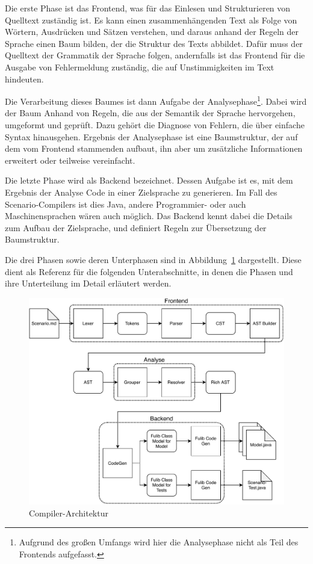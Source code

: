 Die erste Phase ist das Frontend, was für das Einlesen und Strukturieren von Quelltext zuständig ist.
Es kann einen zusammenhängenden Text als Folge von Wörtern, Ausdrücken und Sätzen verstehen,
und daraus anhand der Regeln der Sprache einen Baum bilden,
der die Struktur des Texts abbildet.
Dafür muss der Quelltext der Grammatik der Sprache folgen,
andernfalls ist das Frontend für die Ausgabe von Fehlermeldung zuständig,
die auf Unstimmigkeiten im Text hindeuten.

Die Verarbeitung dieses Baumes ist dann Aufgabe der Analysephase\footnote{Aufgrund des großen Umfangs wird hier die Analysephase nicht als Teil des Frontends aufgefasst.}.
Dabei wird der Baum Anhand von Regeln, die aus der Semantik der Sprache hervorgehen, umgeformt und geprüft.
Dazu gehört die Diagnose von Fehlern, die über einfache Syntax hinausgehen.
Ergebnis der Analysephase ist eine Baumstruktur,
der auf dem vom Frontend stammenden aufbaut, ihn aber um zusätzliche Informationen erweitert oder teilweise vereinfacht.

Die letzte Phase wird als Backend bezeichnet.
Dessen Aufgabe ist es, mit dem Ergebnis der Analyse Code in einer Zielsprache zu generieren.
Im Fall des Scenario-Compilers ist dies Java, andere Programmier- oder auch Maschinensprachen wären auch möglich.
Das Backend kennt dabei die Details zum Aufbau der Zielsprache,
und definiert Regeln zur Übersetzung der Baumstruktur.

Die drei Phasen sowie deren Unterphasen sind in Abbildung~\ref{fig:compiler-architecture} dargestellt.
Diese dient als Referenz für die folgenden Unterabschnitte,
in denen die Phasen und ihre Unterteilung im Detail erläutert werden.

\begin{figure}
    \includegraphics[width=\textwidth]{chapter/fulib-scenarios/img/architecture.pdf}
    \caption{Compiler-Architektur}
    \label{fig:compiler-architecture}
\end{figure}

